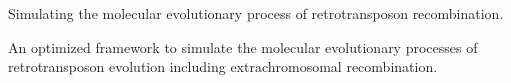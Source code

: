 Simulating the molecular evolutionary process of retrotransposon recombination.

An optimized framework to simulate the molecular evolutionary processes of retrotransposon evolution including extrachromosomal recombination. 